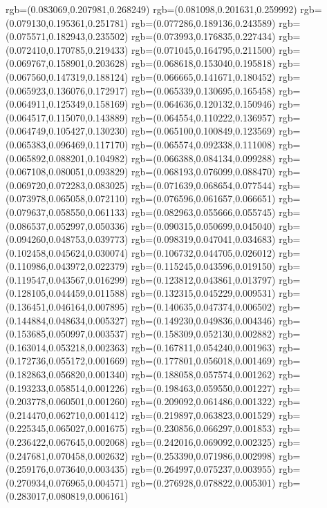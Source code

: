 {{{			rgb=(0.083069,0.207981,0.268249)
			rgb=(0.081098,0.201631,0.259992)
			rgb=(0.079130,0.195361,0.251781)
			rgb=(0.077286,0.189136,0.243589)
			rgb=(0.075571,0.182943,0.235502)
			rgb=(0.073993,0.176835,0.227434)
			rgb=(0.072410,0.170785,0.219433)
			rgb=(0.071045,0.164795,0.211500)
			rgb=(0.069767,0.158901,0.203628)
			rgb=(0.068618,0.153040,0.195818)
			rgb=(0.067560,0.147319,0.188124)
			rgb=(0.066665,0.141671,0.180452)
			rgb=(0.065923,0.136076,0.172917)
			rgb=(0.065339,0.130695,0.165458)
			rgb=(0.064911,0.125349,0.158169)
			rgb=(0.064636,0.120132,0.150946)
			rgb=(0.064517,0.115070,0.143889)
			rgb=(0.064554,0.110222,0.136957)
			rgb=(0.064749,0.105427,0.130230)
			rgb=(0.065100,0.100849,0.123569)
			rgb=(0.065383,0.096469,0.117170)
			rgb=(0.065574,0.092338,0.111008)
			rgb=(0.065892,0.088201,0.104982)
			rgb=(0.066388,0.084134,0.099288)
			rgb=(0.067108,0.080051,0.093829)
			rgb=(0.068193,0.076099,0.088470)
			rgb=(0.069720,0.072283,0.083025)
			rgb=(0.071639,0.068654,0.077544)
			rgb=(0.073978,0.065058,0.072110)
			rgb=(0.076596,0.061657,0.066651)
			rgb=(0.079637,0.058550,0.061133)
			rgb=(0.082963,0.055666,0.055745)
			rgb=(0.086537,0.052997,0.050336)
			rgb=(0.090315,0.050699,0.045040)
			rgb=(0.094260,0.048753,0.039773)
			rgb=(0.098319,0.047041,0.034683)
			rgb=(0.102458,0.045624,0.030074)
			rgb=(0.106732,0.044705,0.026012)
			rgb=(0.110986,0.043972,0.022379)
			rgb=(0.115245,0.043596,0.019150)
			rgb=(0.119547,0.043567,0.016299)
			rgb=(0.123812,0.043861,0.013797)
			rgb=(0.128105,0.044459,0.011588)
			rgb=(0.132315,0.045229,0.009531)
			rgb=(0.136451,0.046164,0.007895)
			rgb=(0.140635,0.047374,0.006502)
			rgb=(0.144884,0.048634,0.005327)
			rgb=(0.149230,0.049836,0.004346)
			rgb=(0.153685,0.050997,0.003537)
			rgb=(0.158309,0.052130,0.002882)
			rgb=(0.163014,0.053218,0.002363)
			rgb=(0.167811,0.054240,0.001963)
			rgb=(0.172736,0.055172,0.001669)
			rgb=(0.177801,0.056018,0.001469)
			rgb=(0.182863,0.056820,0.001340)
			rgb=(0.188058,0.057574,0.001262)
			rgb=(0.193233,0.058514,0.001226)
			rgb=(0.198463,0.059550,0.001227)
			rgb=(0.203778,0.060501,0.001260)
			rgb=(0.209092,0.061486,0.001322)
			rgb=(0.214470,0.062710,0.001412)
			rgb=(0.219897,0.063823,0.001529)
			rgb=(0.225345,0.065027,0.001675)
			rgb=(0.230856,0.066297,0.001853)
			rgb=(0.236422,0.067645,0.002068)
			rgb=(0.242016,0.069092,0.002325)
			rgb=(0.247681,0.070458,0.002632)
			rgb=(0.253390,0.071986,0.002998)
			rgb=(0.259176,0.073640,0.003435)
			rgb=(0.264997,0.075237,0.003955)
			rgb=(0.270934,0.076965,0.004571)
			rgb=(0.276928,0.078822,0.005301)
			rgb=(0.283017,0.080819,0.006161)
}}}
